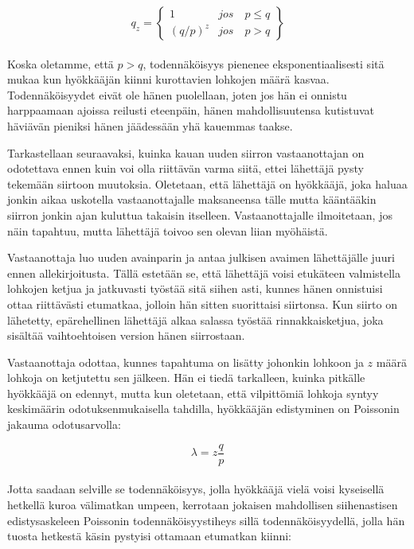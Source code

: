 \documentclass{article}
\begin{document}
\begin{equation*}
   q_{z} = 
   \begin{Bmatrix}
 1 & jos\quad p \leq q \\
  (q/p)^{z} & jos\quad p > q
 \end{Bmatrix}
\end{equation*}
\paragraph{}
Koska oletamme, että $p > q$, todennäköisyys pienenee eksponentiaalisesti sitä mukaa kun hyökkääjän kiinni kurottavien lohkojen määrä kasvaa. Todennäköisyydet eivät ole hänen puolellaan, joten jos hän ei onnistu harppaamaan ajoissa reilusti eteenpäin, hänen mahdollisuutensa kutistuvat häviävän pieniksi hänen jäädessään yhä kauemmas taakse.

Tarkastellaan seuraavaksi, kuinka kauan uuden siirron vastaanottajan on odotettava ennen kuin voi olla riittävän varma siitä, ettei lähettäjä pysty tekemään siirtoon muutoksia. Oletetaan, että lähettäjä on hyökkääjä, joka haluaa jonkin aikaa uskotella vastaanottajalle maksaneensa tälle mutta kääntääkin siirron jonkin ajan kuluttua takaisin itselleen. Vastaanottajalle ilmoitetaan, jos näin tapahtuu, mutta lähettäjä toivoo sen olevan liian myöhäistä.

Vastaanottaja luo uuden avainparin ja antaa julkisen avaimen lähettäjälle juuri ennen allekirjoitusta. Tällä estetään se, että lähettäjä voisi etukäteen valmistella lohkojen ketjua ja jatkuvasti työstää sitä siihen asti, kunnes hänen onnistuisi ottaa riittävästi etumatkaa, jolloin hän sitten suorittaisi siirtonsa. Kun siirto on lähetetty, epärehellinen lähettäjä alkaa salassa työstää rinnakkaisketjua, joka sisältää vaihtoehtoisen version hänen siirrostaan.

Vastaanottaja odottaa, kunnes tapahtuma on lisätty johonkin lohkoon ja $z$ määrä lohkoja on ketjutettu sen jälkeen. Hän ei tiedä tarkalleen, kuinka pitkälle hyökkääjä on edennyt, mutta kun oletetaan, että vilpittömiä lohkoja syntyy keskimäärin odotuksenmukaisella tahdilla, hyökkääjän edistyminen on Poissonin jakauma odotusarvolla:

\begin{equation*}
   \lambda = z \frac{q}{p}
\end{equation*}

\paragraph{} Jotta saadaan selville se todennäköisyys, jolla hyökkääjä vielä voisi kyseisellä hetkellä kuroa välimatkan umpeen, kerrotaan jokaisen mahdollisen siihenastisen edistysaskeleen Poissonin todennäköisyystiheys sillä todennäköisyydellä, jolla hän tuosta hetkestä käsin pystyisi ottamaan etumatkan kiinni:
\end{document}
